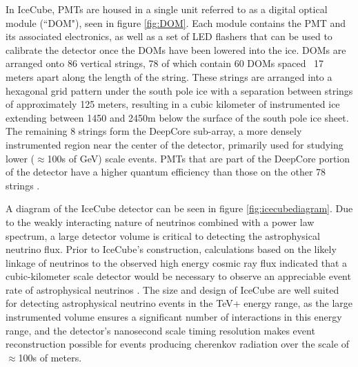 In IceCube, PMTs are housed in a single unit referred to as a digital optical module (``DOM"), seen in figure \ref{fig:DOM}. Each module contains the PMT and its associated electronics, as well as a set of LED flashers that can be used to calibrate the detector once the DOMs have been lowered into the ice. DOMs are arranged onto 86 vertical strings, 78 of which contain 60 DOMs spaced ~17 meters apart along the length of the string. These strings are arranged into a hexagonal grid pattern under the south pole ice with a separation between strings of approximately 125 meters, resulting in a cubic kilometer of instrumented ice extending between 1450 and 2450m below the surface of the south pole ice sheet. The remaining 8 strings form the DeepCore sub-array, a more densely instrumented region near the center of the detector, primarily used for studying lower ($\approx$100s of GeV) scale events. PMTs that are part of the DeepCore portion of the detector have a higher quantum efficiency than those on the other 78 strings \cite{deepcorepaper}.  

A diagram of the IceCube detector can be seen in figure \ref{fig:icecubediagram}. Due to the weakly interacting nature of neutrinos combined with a power law spectrum, a large detector volume is critical to detecting the astrophysical neutrino flux. Prior to IceCube's construction, calculations based on the likely linkage of neutrinos to the observed high energy cosmic ray flux indicated that a cubic-kilometer scale detector would be necessary to observe an appreciable event rate of astrophysical neutrinos \cite{Halzen_2002}\cite{Waxman_1998}. The size and design of IceCube are well suited for detecting astrophysical neutrino events in the TeV+ energy range, as the large instrumented volume ensures a significant number of interactions in this energy range, and the detector's nanosecond scale timing resolution makes event reconstruction possible for events producing cherenkov radiation over the scale of $\approx$100s of meters. 

